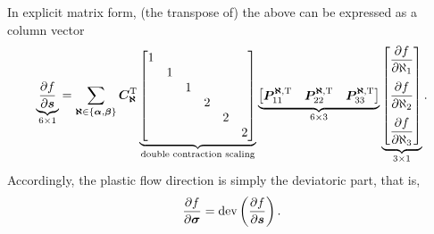 In explicit matrix form, (the transpose of) the above can be expressed as a column vector
\begin{gather}
    \underbrace{\dfrac{\partial{f}}{\partial{\bm{s}}}}_{6\times1}=\sum_{\bm{\aleph}\in\{\bm{\alpha},\bm{\beta}\}}\bm{C}_{\bm{\aleph}}^{\mathrm{T}}\underbrace{\begin{bmatrix}
        1 &   &   &   &   &   \\
          & 1 &   &   &   &   \\
          &   & 1 &   &   &   \\
          &   &   & 2 &   &   \\
          &   &   &   & 2 &   \\
          &   &   &   &   & 2
    \end{bmatrix}}_{\text{double contraction scaling}}\underbrace{\begin{bmatrix}
            \bm{P}_{11}^{\bm{\aleph},\mathrm{T}} & \bm{P}_{22}^{\bm{\aleph},\mathrm{T}} & \bm{P}_{33}^{\bm{\aleph},\mathrm{T}}
        \end{bmatrix}}_{6\times3}\underbrace{\begin{bmatrix}
            \dfrac{\partial{f}}{\partial{\aleph_1}} \\[4mm] \dfrac{\partial{f}}{\partial{\aleph_2}} \\[4mm] \dfrac{\partial{f}}{\partial{\aleph_3}}
        \end{bmatrix}}_{3\times1}.
\end{gather}
Accordingly, the plastic flow direction is simply the deviatoric part, that is,
\begin{gather}
    \dfrac{\partial{f}}{\partial{\bm{\sigma}}}=\text{dev}\left(\dfrac{\partial{f}}{\partial{\bm{s}}}\right).
\end{gather}


